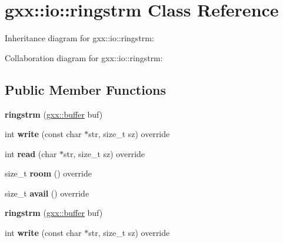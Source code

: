 \hypertarget{classgxx_1_1io_1_1ringstrm}{}\section{gxx\+:\+:io\+:\+:ringstrm Class Reference}
\label{classgxx_1_1io_1_1ringstrm}


Inheritance diagram for gxx\+:\+:io\+:\+:ringstrm\+:


Collaboration diagram for gxx\+:\+:io\+:\+:ringstrm\+:
\subsection*{Public Member Functions}
\begin{DoxyCompactItemize}
\item 
{\bfseries ringstrm} (\hyperlink{classgxx_1_1buffer}{gxx\+::buffer} buf)\hypertarget{classgxx_1_1io_1_1ringstrm_a8853f624db0b82d5d5e74d98a64eb719}{}\label{classgxx_1_1io_1_1ringstrm_a8853f624db0b82d5d5e74d98a64eb719}

\item 
int {\bfseries write} (const char $\ast$str, size\+\_\+t sz) override\hypertarget{classgxx_1_1io_1_1ringstrm_ab02d949b341edb2d358d6951ce022d4a}{}\label{classgxx_1_1io_1_1ringstrm_ab02d949b341edb2d358d6951ce022d4a}

\item 
int {\bfseries read} (char $\ast$str, size\+\_\+t sz) override\hypertarget{classgxx_1_1io_1_1ringstrm_a43ab52d8e77d95c132f1b2e5ac1df049}{}\label{classgxx_1_1io_1_1ringstrm_a43ab52d8e77d95c132f1b2e5ac1df049}

\item 
size\+\_\+t {\bfseries room} () override\hypertarget{classgxx_1_1io_1_1ringstrm_a9c9b15c0384aeb64540b943bc1a30cc8}{}\label{classgxx_1_1io_1_1ringstrm_a9c9b15c0384aeb64540b943bc1a30cc8}

\item 
size\+\_\+t {\bfseries avail} () override\hypertarget{classgxx_1_1io_1_1ringstrm_a54386d2cb61dd37fd2aded74ddbfef0d}{}\label{classgxx_1_1io_1_1ringstrm_a54386d2cb61dd37fd2aded74ddbfef0d}

\item 
{\bfseries ringstrm} (\hyperlink{classgxx_1_1buffer}{gxx\+::buffer} buf)\hypertarget{classgxx_1_1io_1_1ringstrm_a8853f624db0b82d5d5e74d98a64eb719}{}\label{classgxx_1_1io_1_1ringstrm_a8853f624db0b82d5d5e74d98a64eb719}

\item 
int {\bfseries write} (const char $\ast$str, size\+\_\+t sz) override\hypertarget{classgxx_1_1io_1_1ringstrm_ab02d949b341edb2d358d6951ce022d4a}{}\label{classgxx_1_1io_1_1ringstrm_ab02d949b341edb2d358d6951ce022d4a}


\end{DoxyCompactItemize}
